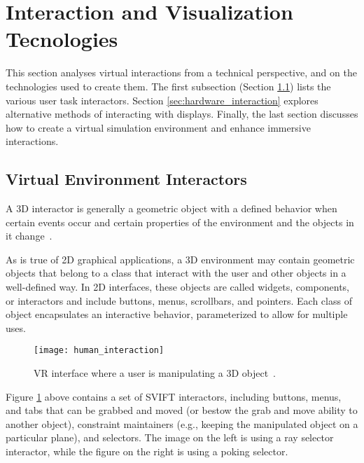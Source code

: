 \section{Interaction and Visualization Tecnologies}
\label{sec:interaction_visualization}

This section analyses virtual interactions from a technical perspective, and on the technologies used to create them.
The first subsection (Section \ref{sec:interactors}) lists the various user task interactors. 
Section \ref{sec:hardware_interaction} explores alternative methods of interacting with displays. 
Finally, the last section discusses how to create a virtual simulation environment and enhance immersive interactions.

\subsection{Virtual Environment Interactors}
\label{sec:interactors}


A \gls{3D} interactor is generally a geometric object with a defined behavior when certain events 
occur and certain properties of the environment and the objects in it change~\cite{hale2014handbook}.

As is true of \gls{2D} graphical applications, a \gls{3D} environment may contain geometric objects that 
belong to a class that interact with the user and other objects in a well-defined way. In \gls{2D} interfaces, 
these objects are called widgets, components, or interactors and include buttons, menus, scrollbars, 
and pointers. Each class of object encapsulates an interactive behavior, parameterized to allow for 
multiple uses. 



\begin{figure}[h!]
    \centering
    \texttt{[image: human\_interaction]}
    \caption{\gls{VR} interface where a user is manipulating a \gls{3D} object~\cite{hale2014handbook}.} %
    \label{fig:human_interaction}
\end{figure}
\FloatBarrier




Figure \ref{fig:human_interaction} above contains a set of \gls{SVIFT} interactors, including buttons, menus, and tabs
that can be grabbed and moved (or bestow the grab and move ability to another object), constraint maintainers 
(e.g., keeping the manipulated object on a particular plane), and selectors. The image on the left is using a 
ray selector interactor, while the figure on the right is using a poking selector.


